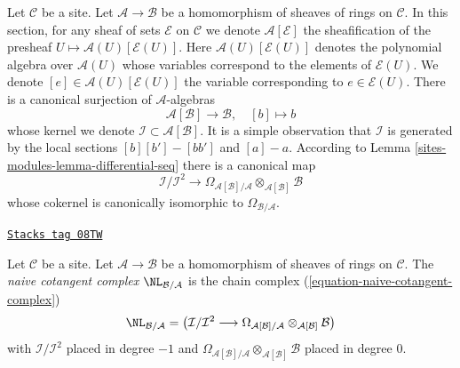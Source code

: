 \medskip\noindent
Let $\mathcal{C}$ be a site. Let $\mathcal{A} \to \mathcal{B}$ be a
homomorphism of sheaves of rings on $\mathcal{C}$. In this section,
for any sheaf of sets $\mathcal{E}$ on $\mathcal{C}$ we denote
 $\mathcal{A}[\mathcal{E}]$ the sheafification
of the presheaf $U \mapsto \mathcal{A}(U)[\mathcal{E}(U)]$. Here
$\mathcal{A}(U)[\mathcal{E}(U)]$
denotes the polynomial algebra over $\mathcal{A}(U)$
whose variables correspond to the elements of $\mathcal{E}(U)$.
We denote $[e] \in \mathcal{A}(U)[\mathcal{E}(U)]$ the variable
corresponding to $e \in \mathcal{E}(U)$.
There is a canonical surjection of $\mathcal{A}$-algebras
\begin{equation}
\label{equation-canonical-presentation}
\mathcal{A}[\mathcal{B}] \longrightarrow \mathcal{B},\quad [b] \longmapsto b
\end{equation}
whose kernel we denote $\mathcal{I} \subset \mathcal{A}[\mathcal{B}]$.
It is a simple observation that $\mathcal{I}$ is generated by the
local sections $[b][b'] - [bb']$ and $[a] - a$. According to
Lemma \ref{sites-modules-lemma-differential-seq} there is a canonical map
\begin{equation}
\label{equation-naive-cotangent-complex}
\mathcal{I}/\mathcal{I}^2
\longrightarrow
\Omega_{\mathcal{A}[\mathcal{B}]/\mathcal{A}}
\otimes_{\mathcal{A}[\mathcal{B}]} \mathcal{B}
\end{equation}
whose cokernel is canonically isomorphic to $\Omega_{\mathcal{B}/\mathcal{A}}$.

\begin{definition}
\label{sites-modules-definition-naive-cotangent-complex}
\href{https://stacks.math.columbia.edu/tag/08TW}{\texttt{Stacks tag 08TW}}

Let $\mathcal{C}$ be a site. Let $\mathcal{A} \to \mathcal{B}$ be a
homomorphism of sheaves of rings on $\mathcal{C}$.
The {\it naive cotangent complex} $\NL_{\mathcal{B}/\mathcal{A}}$
is the chain complex (\ref{equation-naive-cotangent-complex})
$$
\NL_{\mathcal{B}/\mathcal{A}} =
\left(\mathcal{I}/\mathcal{I}^2
\longrightarrow
\Omega_{\mathcal{A}[\mathcal{B}]/\mathcal{A}}
\otimes_{\mathcal{A}[\mathcal{B}]} \mathcal{B}\right)
$$
with $\mathcal{I}/\mathcal{I}^2$ placed in degree $-1$ and
$\Omega_{\mathcal{A}[\mathcal{B}]/\mathcal{A}}
\otimes_{\mathcal{A}[\mathcal{B}]} \mathcal{B}$
placed in degree $0$.
\end{definition}

